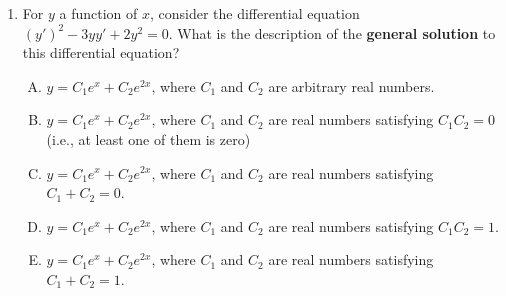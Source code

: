 \documentclass[10pt]{amsart}
\begin{document}
\begin{enumerate}
  \begin{enumerate}[(A)]
  \item If either limit is finite, then both are finite and they are
    equal. Otherwise, both the limits are infinities of opposite
    signs.
  \item If either limit is finite, then both are finite and they are
    equal. Otherwise, both the limits are infinities of the same sign.
  \item One of the limits is finite and the other is infinite.
  \item Both the limits are finite and unequal.
  \item Both the limits are infinite but they may be of the same or of
    opposite signs.
  \end{enumerate}

  {\em Answer}: Option (A)

  {\em Explanation}: Solving, we see that $f(x)$ is a function of the
  form $ax + b$, where $a$ and $b$ are constants. There are three
  cases: $a = 0$, in which case $f$ is a constant function, $a > 0$,
  in which case $f$ approaches $+\infty$ as $x \to \infty$ and
  approaches $-\infty$ as $x$ approaches $-\infty$, and $a < 0$, in
  which case $f$ approaches $-\infty$ as $x$ approaches $+\infty$ and
  approaches $-\infty$ as $x$ approaches $+\infty$.

  {\em Performance review}: All $10$ got this.

  {\em Historical note (last year)}: $13$ out of $26$ people got this
  correct. $6$ people chose (B) and $7$ people chose (E). Of the
  people who chose (B), some seem to have mistakenly considered the
  general solution to be quadratic rather than linear.
\item For $y$ a function of $x$, consider the differential equation
  $(y')^2 - 3yy' + 2y^2 = 0$. What is the description of the {\bf
  general solution} to this differential equation?

  \begin{enumerate}[(A)]
  \item $y = C_1e^x + C_2e^{2x}$, where $C_1$ and $C_2$ are arbitrary
    real numbers.
  \item $y = C_1e^x + C_2e^{2x}$, where $C_1$ and $C_2$ are real
    numbers satisfying $C_1C_2 = 0$ (i.e., at least one of them is
    zero)
  \item $y = C_1e^x + C_2e^{2x}$, where $C_1$ and $C_2$ are real
    numbers satisfying $C_1 + C_2 = 0$.
  \item $y = C_1e^x + C_2e^{2x}$, where $C_1$ and $C_2$ are real
    numbers satisfying $C_1C_2 = 1$.
  \item $y = C_1e^x + C_2e^{2x}$, where $C_1$ and $C_2$ are real
    numbers satisfying $C_1 + C_2 = 1$.
  \end{enumerate}


\end{enumerate}
\end{document}
